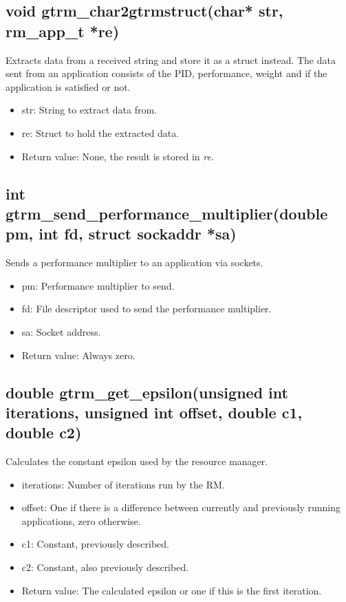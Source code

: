 \documentclass[nobiblatex]{LTHthesis}
\begin{document}
\subsection{void gtrm\_char2gtrmstruct(char* str, rm\_app\_t *re)}
Extracts data from a received string and store it as a struct instead. The data sent from an application consists of the PID, performance, weight and if the application is satisfied or not.
\begin{itemize} 
\item str: String to extract data from.
\item re: Struct to hold the extracted data.
\item Return value: None, the result is stored in \emph{re}.
\end{itemize}

\subsection{int gtrm\_send\_performance\_multiplier(double pm, int fd, struct sockaddr *sa)}
Sends a performance multiplier to an application via sockets.
\begin{itemize} 
\item pm: Performance multiplier to send.
\item fd: File descriptor used to send the performance multiplier.
\item sa: Socket address.
\item Return value: Always zero.
\end{itemize}

\subsection{double gtrm\_get\_epsilon(unsigned int iterations, unsigned int offset, double c1, double c2)}
Calculates the constant epsilon used by the resource manager.
\begin{itemize} 
\item iterations: Number of iterations run by the RM.
\item offset: One if there is a difference between currently and previously running applications, zero otherwise.
\item c1: Constant, previously described.
\item c2: Constant, also previously described.
\item Return value: The calculated epsilon or one if this is the first iteration.
\end{itemize}
\end{document}
